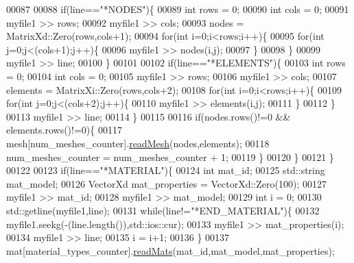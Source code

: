 \begin{DoxyCode}
00087 
00088             \textcolor{keywordflow}{if}(line==\textcolor{stringliteral}{"*NODES"})\{
00089               \textcolor{keywordtype}{int} rows = 0;
00090               \textcolor{keywordtype}{int} cols = 0;
00091               myfile1 >> rows;
00092               myfile1 >> cols;
00093               nodes = MatrixXd::Zero(rows,cols+1);
00094               \textcolor{keywordflow}{for}(\textcolor{keywordtype}{int} i=0;i<rows;i++)\{
00095                 \textcolor{keywordflow}{for}(\textcolor{keywordtype}{int} j=0;j<(cols+1);j++)\{
00096                   myfile1 >> nodes(i,j);
00097                 \}
00098               \}
00099               myfile1 >> line;
00100             \}
00101 
00102             \textcolor{keywordflow}{if}(line==\textcolor{stringliteral}{"*ELEMENTS"})\{
00103               \textcolor{keywordtype}{int} rows = 0;
00104               \textcolor{keywordtype}{int} cols = 0;
00105               myfile1 >> rows;
00106               myfile1 >> cols;
00107               elements = MatrixXi::Zero(rows,cols+2);
00108               \textcolor{keywordflow}{for}(\textcolor{keywordtype}{int} i=0;i<rows;i++)\{
00109                 \textcolor{keywordflow}{for}(\textcolor{keywordtype}{int} j=0;j<(cols+2);j++)\{
00110                   myfile1 >> elements(i,j);
00111                 \}
00112               \}
00113               myfile1 >> line;
00114             \}
00115 
00116             \textcolor{keywordflow}{if}(nodes.rows()!=0 && elements.rows()!=0)\{
00117               mesh[num\_meshes\_counter].\hyperlink{class_mesh_aba57df50d740f660cadf00aefe75e157}{readMesh}(nodes,elements);
00118               num\_meshes\_counter = num\_meshes\_counter + 1;
00119             \}
00120           \}
00121         \}
00122 
00123         \textcolor{keywordflow}{if}(line==\textcolor{stringliteral}{"*MATERIAL"})\{
00124             \textcolor{keywordtype}{int} mat\_id;
00125             std::string mat\_model;
00126             VectorXd mat\_properties = VectorXd::Zero(100);
00127             myfile1 >> mat\_id;
00128             myfile1 >> mat\_model;
00129             \textcolor{keywordtype}{int} i = 0;
00130             std::getline(myfile1,line);
00131               \textcolor{keywordflow}{while}(line!=\textcolor{stringliteral}{"*END\_MATERIAL"})\{
00132                 myfile1.seekg(-(line.length()),std::ios::cur);
00133                 myfile1 >> mat\_properties(i);
00134                 myfile1 >> line;
00135                 i = i+1;
00136               \}
00137             mat[material\_types\_counter].\hyperlink{class_materials_a06e59a5742730b2292d39b7488523505}{readMats}(mat\_id,mat\_model,mat\_properties);

\end{DoxyCode}
